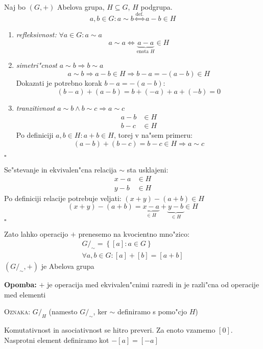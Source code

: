 Naj bo $(G, +)$ Abelova grupa, $H \subseteq G$, $H$ podgrupa.
\begin{equation*}
a, b \in G: a \sim b \stackrel{\text{def.}}{\iff} a - b \in H
\end{equation*}
\begin{enumerate}[(1)]
	\item \emph{refleksivnost:} $\forall a \in G: a \sim a$
	\begin{equation*}
	a \sim a \iff \underbrace{a - a}_{\text{enota $H$}} \in H
	\end{equation*}
	
	\item \emph{simetri"cnost} $a \sim b \Rightarrow b \sim a$
	\begin{equation*}
	a \sim b \Rightarrow a - b \in H \Rightarrow b - a = - (a - b) \in H
	\end{equation*}
	Dokazati je potrebno korak $b - a = -(a - b)$:
	\begin{equation*}
	(b-a) + (a - b) = b + (-a) + a + (-b) = 0
	\end{equation*}
	
	\item \emph{tranzitivnost} $a \sim b \land b \sim c \Rightarrow a \sim c$
	\begin{align*}
	a - b &\in H \\
	b - c &\in H
	\end{align*}
	Po definiciji $a, b \in H: a + b \in H$, torej v na"sem primeru:
	\begin{equation*}
	(a - b )+ (b - c)  = b - c \in H \Rightarrow a \sim c
	\end{equation*}
\end{enumerate}
\hfill $\square$

Se"stevanje in ekvivalen"cna relacija $\sim$ sta usklajeni:
\begin{align*}
x - a &\in H \\
y - b &\in H
\end{align*}
Po definiciji relacije potrebuje veljati: $(x + y) - (a + b) \in H$
\begin{equation*}
(x + y) - (a + b) = \underbrace{x - a}_{\in H} + \underbrace{y - b}_{\in H} \in H
\end{equation*}
\hfill $\square$

Zato lahko operacijo $+$ prenesemo na kvocientno mno"zico:
\begin{gather*}
G/_\sim = \left\{[a]: a \in G\right\} \\
\forall a, b \in G: [a] + [b] = [a + b]
\end{gather*}
$(G/_\sim, +)$ je Abelova grupa

\textbf{Opomba:} $+$ je operacija med ekvivalen"cnimi razredi in je razli"cna od operacije med elementi

\textsc{Oznaka:} $G/_H$ (namesto $G/_\sim$, ker $\sim$ definiramo s pomo"cjo $H$)

Komutativnost in asociativnost se hitro preveri. Za enoto vzamemo $[0]$. Nasprotni element definiramo kot $-[a] = [-a]$